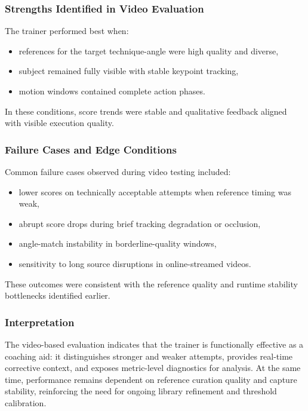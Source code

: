\documentclass[12pt]{article}
\begin{document}
{\subsubsection{Strengths Identified in Video Evaluation}

The trainer performed best when:

\begin{itemize}
    \item references for the target technique-angle were high quality and diverse,
    \item subject remained fully visible with stable keypoint tracking,
    \item motion windows contained complete action phases.
\end{itemize}

In these conditions, score trends were stable and qualitative feedback aligned with visible execution quality.

\subsubsection{Failure Cases and Edge Conditions}

Common failure cases observed during video testing included:

\begin{itemize}
    \item lower scores on technically acceptable attempts when reference timing was weak,
    \item abrupt score drops during brief tracking degradation or occlusion,
    \item angle-match instability in borderline-quality windows,
    \item sensitivity to long source disruptions in online-streamed videos.
\end{itemize}

These outcomes were consistent with the reference quality and runtime stability bottlenecks identified earlier.

\subsubsection{Interpretation}

The video-based evaluation indicates that the trainer is functionally effective as a coaching aid: it distinguishes stronger and weaker attempts, provides real-time corrective context, and exposes metric-level diagnostics for analysis. At the same time, performance remains dependent on reference curation quality and capture stability, reinforcing the need for ongoing library refinement and threshold calibration.

}
\end{document}

